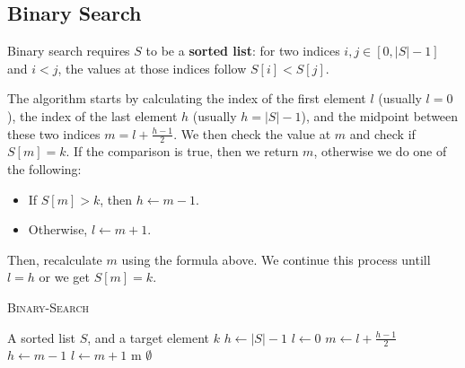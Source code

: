 \subsection{Binary Search}

Binary search requires \( S \) to be a \textbf{sorted list}: for two indices \( i,j \in \left[0, |S| - 1\right] \) and \( i < j \), the values at those indices follow \( S[i] < S[j] \).

The algorithm starts by calculating the index  of the first element \( l \) (usually \( l = 0 \)), the index of the last element \( h \) (usually \( h = |S| - 1\)), and the midpoint between these two indices \( m = l + \frac{h-1}{2}\). We then check the value at \( m \) and check if \( S[m] = k \). If the comparison is true, then we return \( m \), otherwise we do one of the following:

\begin{itemize}
    \item If \( S[m] > k \), then \( h \gets m - 1 \).
    \item Otherwise, \( l \gets m + 1 \).
\end{itemize}

Then, recalculate \( m \) using the formula above. We continue this process untill \( l = h \) or we get \( S[m] = k \).

\begin{algorithm}
    \caption{\textsc{Binary-Search}}
    \label{alg:binary_search}
    \begin{algorithmic}
        \Require A sorted list \( S \), and a target element \( k \)
        \State \( h \gets |S| - 1 \)
        \State \( l \gets 0 \)
            \State \( m \gets  l + \frac{h-1}{2}\)
                \State \( h \gets m - 1 \)
                \State \( l \gets m + 1 \)
            \Else
                \State \Return m
            \EndIf
        \EndWhile
        \State \Return \( \emptyset \)
    \end{algorithmic}
\end{algorithm}
